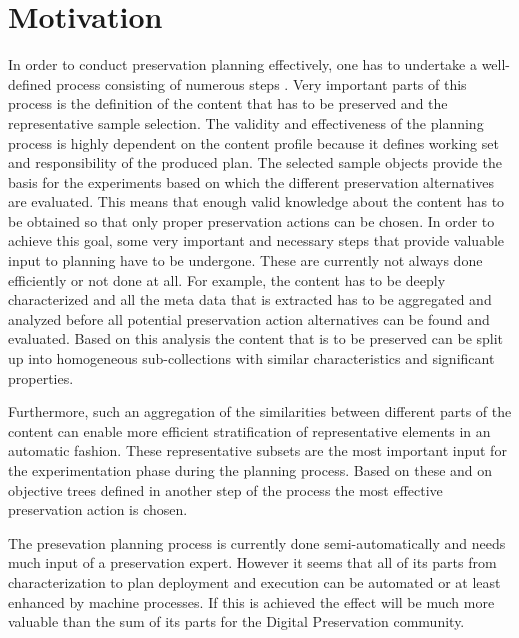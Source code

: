 \section{Motivation}
In order to conduct preservation planning effectively, one has to undertake a well-defined process consisting of numerous steps \cite{Becker:2009fk}. Very important parts of this process is the definition of the content that has to be preserved and the representative sample selection. The validity and effectiveness of the planning process is highly dependent on the content profile because it defines working set and responsibility of the produced plan. The selected sample objects provide the basis for the experiments based on which the different preservation alternatives are evaluated. This means that enough valid knowledge about the content has to be obtained so that only proper preservation actions can be chosen. In order to achieve this goal, some very important and necessary steps that provide valuable input to planning have to be undergone. These are currently not always done efficiently or not done at all. For example, the content has to be deeply characterized and all the meta data that is extracted has to be aggregated and analyzed before all potential preservation action alternatives can be found and evaluated. Based on this analysis the content that is to be preserved can be split up into homogeneous sub-collections with similar characteristics and significant properties.

Furthermore, such an aggregation of the similarities between different parts of the content can enable more efficient stratification of representative elements in an automatic fashion. These representative subsets are the most important input for the experimentation phase during the planning process. Based on these and on objective trees defined in another step of the process the most effective preservation action is chosen.

The presevation planning process is currently done semi-automatically and needs much input of a preservation expert. However it seems that all of its parts from characterization to plan deployment and execution can be automated or at least enhanced by machine processes. If this is achieved the effect will be much more valuable than the sum of its parts for the Digital Preservation community.

